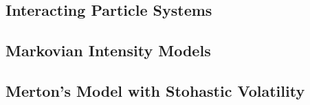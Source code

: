 \subsection{Interacting Particle Systems}
\subsection{Markovian Intensity Models}
\subsection{Merton's Model with Stohastic Volatility}

